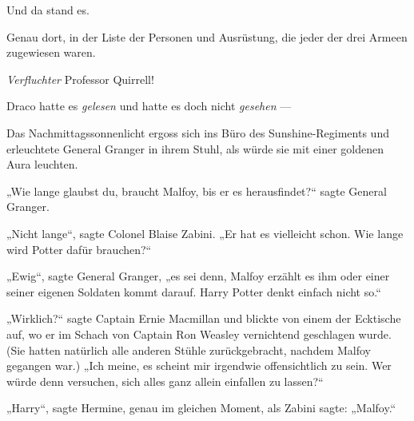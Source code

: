 Und da stand es.

Genau dort, in der Liste der Personen und Ausrüstung, die jeder der drei Armeen zugewiesen waren.

\emph{Verfluchter} Professor Quirrell!

Draco hatte es \emph{gelesen} und hatte es doch nicht \emph{gesehen} —

\later

Das Nachmittagssonnenlicht ergoss sich ins Büro des Sunshine-Regiments und erleuchtete General Granger in ihrem Stuhl, als würde sie mit einer goldenen Aura leuchten.

„Wie lange glaubst du, braucht Malfoy, bis er es herausfindet?“ sagte General Granger.

„Nicht lange“, sagte Colonel Blaise Zabini.
„Er hat es vielleicht schon. Wie lange wird Potter dafür brauchen?“

„Ewig“, sagte General Granger, „es sei denn, Malfoy erzählt es ihm oder einer seiner eigenen Soldaten kommt darauf. Harry Potter denkt einfach nicht so.“

„Wirklich?“ sagte Captain Ernie Macmillan und blickte von einem der Ecktische auf, wo er im Schach von Captain Ron Weasley vernichtend geschlagen wurde. (Sie hatten natürlich alle anderen Stühle zurückgebracht, nachdem Malfoy gegangen war.)
„Ich meine, es scheint mir irgendwie offensichtlich zu sein. Wer würde denn versuchen, sich alles ganz allein einfallen zu lassen?“

„Harry“, sagte Hermine, genau im gleichen Moment, als Zabini sagte:
„Malfoy.“

